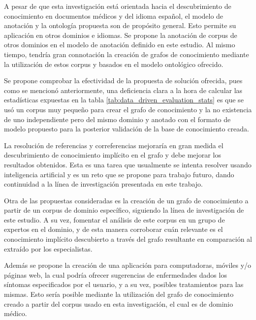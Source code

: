 \label{chapter:recommendations}

A pesar de que esta investigación está orientada hacia el descubrimiento de conocimiento en documentos médicos y del idioma español, el modelo de anotación y la ontología propuesta son de propósito general. Esto permite su aplicación en otros dominios e idiomas. Se propone la anotación de corpus de otros dominios en el modelo de anotación definido en este estudio. Al mismo tiempo, tendría gran connotación la creación de grafos de conocimiento mediante la utilización de estos corpus y basados en el modelo ontológico ofrecido.

Se propone comprobar la efectividad de la propuesta de solución ofrecida, pues como se mencionó anteriormente, una deficiencia clara a la hora de calcular las estadísticas expuestas en la tabla \ref{tab:data_driven_evaluation_stats} es que se usó un corpus muy pequeño para crear el grafo de conocimiento y la no existencia de uno independiente pero del mismo dominio y anotado con el formato de modelo propuesto para la posterior validación de la base de conocimiento creada.

La resolución de referencias y correferencias mejoraría en gran medida el descubrimiento de conocimiento implícito en el grafo y debe mejorar los resultados obtenidos. Esta es una tarea que usualmente se intenta resolver usando inteligencia artificial y es un reto que se propone para trabajo futuro, dando continuidad a la línea de investigación presentada en este trabajo.

Otra de las propuestas consideradas es la creación de un grafo de conocimiento a partir de un corpus de dominio específico, siguiendo la línea de investigación de este estudio. A su vez, fomentar el análisis de este corpus en un grupo de expertos en el dominio, y de esta manera corroborar cuán relevante es el conocimiento implícito descubierto a través del grafo resultante en comparación al extraído por los especialistas.

Además se propone la creación de una aplicación para computadoras, móviles y/o páginas web, la cual podría ofrecer sugerencias de enfermedades dados los síntomas especificados por el usuario, y a su vez, posibles tratamientos para las mismas. Esto sería posible mediante la utilización del grafo de conocimiento creado a partir del corpus usado en esta investigación, el cual es de dominio médico.